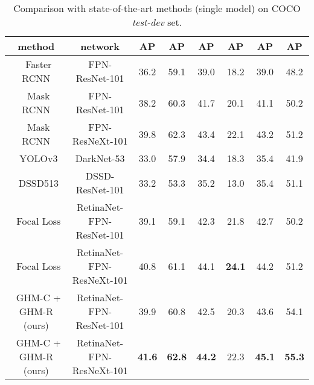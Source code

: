 \documentclass[letterpaper]{article} \usepackage{aaai19}  \usepackage{times}  \usepackage{helvet}  \usepackage{courier}  \usepackage{url}  \usepackage{graphicx}  \usepackage{amsmath,amssymb}
\begin{document}
\begin{table*}[t]
\begin{tabular}{| c | c | c c c | c c c|}
\hline
 method & network
 & AP & AP & AP
 & AP & AP &  AP\\ [.1em]
\hline
 ~Faster RCNN \cite{faster} & FPN-ResNet-101
  & 36.2 & 59.1 & 39.0 & 18.2 & 39.0 & 48.2\\
 ~Mask RCNN \cite{mask} & FPN-ResNet-101
  & 38.2 & 60.3 & 41.7 & 20.1 & 41.1 & 50.2\\
 ~Mask RCNN \cite{mask} & FPN-ResNeXt-101
  & 39.8 & 62.3 & 43.4 & 22.1 & 43.2 & 51.2\\
\hline
 ~YOLOv3 \cite{yolov3} & DarkNet-53 
  & 33.0 & 57.9 & 34.4 & 18.3 & 35.4 & 41.9 \\
 ~DSSD513 \cite{dssd} & DSSD-ResNet-101
  & 33.2 & 53.3 & 35.2 & 13.0 & 35.4 & 51.1 \\
 ~Focal Loss \cite{focal} & RetinaNet-FPN-ResNet-101
  & 39.1 & 59.1 & 42.3 & 21.8 & 42.7 & 50.2 \\
 ~Focal Loss \cite{focal} & RetinaNet-FPN-ResNeXt-101
  & 40.8 & 61.1 & 44.1 & \textbf{24.1} & 44.2 & 51.2 \\
\hline
 ~GHM-C + GHM-R (ours) & RetinaNet-FPN-ResNet-101
  & 39.9 & 60.8 & 42.5 & 20.3 & 43.6 & 54.1 \\
 ~GHM-C + GHM-R (ours) & RetinaNet-FPN-ResNeXt-101
  & \textbf{41.6} & \textbf{62.8} & \textbf{44.2} & 22.3 & \textbf{45.1} & \textbf{55.3} \\
\hline
\end{tabular}
\caption{Comparison with state-of-the-art methods (single model) on COCO \textit{test-dev} set.}
\label{tab:main}
\end{table*}
\end{document}
